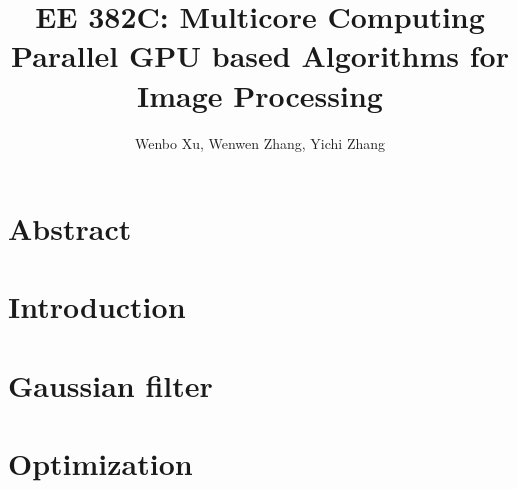 \documentclass[letterpaper, 11 pt, conference]{ieeeconf}  %
\author{Wenbo Xu, Wenwen Zhang, Yichi Zhang}
\title{
	EE 382C: Multicore Computing \protect\\
	\Large \bf Parallel GPU based Algorithms for Image Processing
}
\begin{document}
\maketitle
\thispagestyle{empty}
\pagestyle{empty}


\section{Abstract}
  

\section{Introduction}

\section{Gaussian filter}

\section{Optimization}
\end{document}
